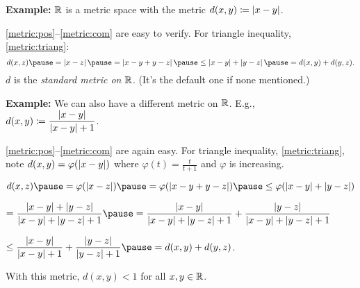 \documentclass[10pt,aspectratio=149]{beamer}
\begin{document}
\begin{frame}

\textbf{Example:}
${\mathbb{R}}$ is a metric space with the metric
\quad $d(x,y) \coloneqq \left\lvert {x-y} \right\rvert$.

\pause
\eqref{metric:pos}--\eqref{metric:com} are easy to verify.
\pause
\quad
For triangle inequality, \eqref{metric:triang}:
\begin{equation*}
d(x,z)
\pause
= \abs{x-z}
\pause
= 
\abs{x-y+y-z}
\pause
\leq
\abs{x-y}+\abs{y-z}
\pause
=
d(x,y)+ d(y,z) .
\end{equation*}
\pause
$d$ is the \emph{standard metric on ${\mathbb{R}}$}.
\pause
\quad (It's the default one if none mentioned.)

\pause
\medskip

\textbf{Example:}
We can also have a different metric on ${\mathbb{R}}$.
\pause
E.g.,
~
$
d(x,y)
\coloneqq
\dfrac{\left\lvert {x-y} \right\rvert}{\left\lvert {x-y} \right\rvert+1}$.

\pause
\eqref{metric:pos}--\eqref{metric:com} are again easy.
\pause
\quad
For triangle inequality, \eqref{metric:triang},
note 
$d(x,y) = \varphi(\left\lvert {x-y} \right\rvert)$ where $\varphi(t) = \frac{t}{t+1}$ and
$\varphi$ is increasing.

\pause
\medskip

$
d(x,z)
\pause
=
\varphi(\abs{x-z})
\pause
= 
\varphi(\abs{x-y+y-z})
\pause
\leq
\varphi(\abs{x-y}+\abs{y-z})
$

\pause
\medskip

\qquad
$
=
\dfrac{\abs{x-y}+\abs{y-z}}{\abs{x-y}+\abs{y-z}+1}
\pause
=
\dfrac{\abs{x-y}}{\abs{x-y}+\abs{y-z}+1} +
\dfrac{\abs{y-z}}{\abs{x-y}+\abs{y-z}+1}
$

\pause
\medskip

\qquad
$
\leq
\dfrac{\abs{x-y}}{\abs{x-y}+1} +
\dfrac{\abs{y-z}}{\abs{y-z}+1}
\pause
=
d(x,y)+ d(y,z)$.

\pause
\medskip

With this metric, $d(x,y) < 1$ for all $x,y \in {\mathbb{R}}$.

\end{frame}
\end{document}
